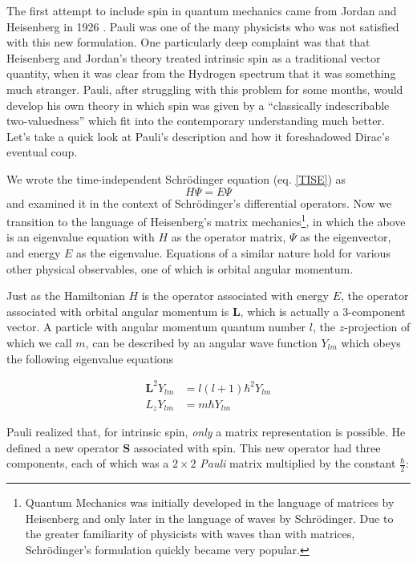 \documentclass[12pt]{book}
\begin{document}
The first attempt to include spin in quantum mechanics came from Jordan and Heisenberg in 1926 \cite{jordan}. Pauli was one of the many physicists who was not satisfied with this new formulation. One particularly deep complaint was that that Heisenberg and Jordan's theory treated intrinsic spin as a traditional vector quantity, when it was clear from the Hydrogen spectrum that it was something much stranger. Pauli, after struggling with this problem for some months, would develop his own theory\cite{pauli:spin} in which spin was given by a ``classically indescribable two-valuedness'' which fit into the contemporary understanding much better. Let's take a quick look at Pauli's description and how it foreshadowed Dirac's eventual coup.

We wrote the time-independent Schr\"{o}dinger equation (eq. \ref{TISE}) as
\begin{equation}
 H\Psi=E\Psi
\end{equation}
and examined it in the context of Schr\"{o}dinger's differential operators. Now we transition to the language of Heisenberg's matrix mechanics\footnote{Quantum Mechanics was initially developed in the language of matrices by Heisenberg and only later in the language of waves by Schr\"{o}dinger. Due to the greater familiarity of physicists with waves than with matrices, Schr\"{o}dinger's formulation quickly became very popular.}, in which the above is an eigenvalue equation with $H$ as the operator matrix, $\Psi$ as the eigenvector, and energy $E$ as the eigenvalue. Equations of a similar nature hold for various other physical observables, one of which is orbital angular momentum.

Just as the Hamiltonian $H$ is the operator associated with energy $E$, the operator associated with orbital angular momentum is $\mathbf{L}$, which is actually a 3-component vector. A particle with angular momentum quantum number $l$, the $z$-projection of which we call $m$, can be described by an angular wave function $Y_{lm}$ which obeys the following eigenvalue equations

\begin{subequations}\label{grp}
\begin{align}
\mathbf{L}^{2}Y_{lm}&=l(l+1)\hbar^{2}Y_{lm}\label{first}\\
L_{z}Y_{lm}&=m\hbar Y_{lm} \label{second}
\end{align}
\end{subequations}

Pauli realized that, for intrinsic spin, \emph{only} a matrix representation is possible. He defined a new operator $\mathbf{S}$ associated with spin. This new operator had three components, each of which was a $2\times 2$ \emph{Pauli} matrix multiplied by the constant $\frac{\hbar}{2}$:
\end{document}
